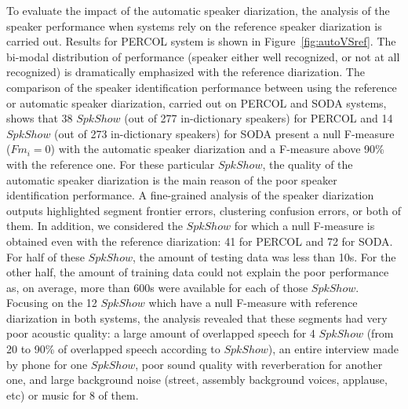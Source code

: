 
To evaluate the impact of the automatic speaker diarization, the analysis of the speaker performance when systems rely on the reference speaker diarization is carried out. Results for PERCOL system is shown in Figure~\ref{fig:autoVSref}.  The bi-modal distribution of performance (speaker either well recognized, or not at all recognized) is dramatically emphasized with the reference diarization.
The comparison of the speaker identification performance between using the reference or automatic speaker diarization, carried out on PERCOL and SODA systems, shows that 38 $SpkShow$ (out of 277 in-dictionary speakers) for PERCOL and 14 $SpkShow$ (out of 273 in-dictionary speakers) for SODA present a null F-measure ($Fm_i=0$) with the automatic speaker diarization and a F-measure above 90\% with the reference one. For these particular $SpkShow$, the quality of the automatic speaker diarization is the main reason of the poor speaker identification performance. A fine-grained analysis of the speaker diarization outputs highlighted segment frontier errors, clustering confusion errors, or both of them. 
In addition, we considered the $SpkShow$ for which a null F-measure is obtained even with the reference diarization: 41 for PERCOL and 72 for SODA. For half of these $SpkShow$, the amount of testing data was less than 10s. For the other half, the amount of training data could not explain the poor performance as, on average, more than 600s were available for each of those $SpkShow$.
Focusing on the 12 $SpkShow$ which have a null F-measure with reference diarization in both systems, the analysis revealed that these segments had very poor acoustic quality: a large amount of overlapped speech for 4 $SpkShow$ (from 20 to 90\% of overlapped speech according to  $SpkShow$), an entire interview made by phone for one $SpkShow$, poor sound quality with reverberation for another one, and large background noise (street, assembly background voices, applause, etc) or music for 8 of them.

